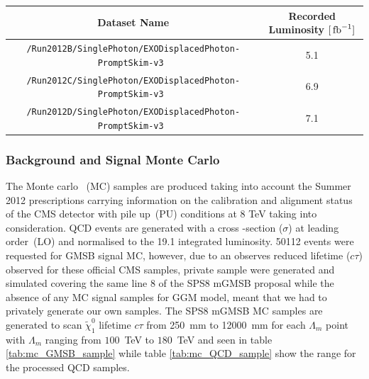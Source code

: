 \begin{center}
\centering
\begin{tabular}{c c}
\hline
Dataset Name & Recorded Luminosity $[\mbox{\ensuremath{\,\text{fb}^\text{$-$1}}}]$ \\
\hline
 \texttt{/Run2012B/SinglePhoton/EXODisplacedPhoton-PromptSkim-v3 } & 5.1 \\
 \texttt{/Run2012C/SinglePhoton/EXODisplacedPhoton-PromptSkim-v3 } & 6.9 \\
 \texttt{/Run2012D/SinglePhoton/EXODisplacedPhoton-PromptSkim-v3 } & 7.1 \\
\hline
\end{tabular}
\label{tab:DATA}
\end{center}


\subsubsection*{Background and Signal Monte Carlo}
The Monte carlo ~(MC) samples are produced taking into account the Summer 2012 prescriptions carrying information on the calibration and alignment status of the CMS detector with pile up~(PU) conditions at 8 TeV taking into consideration.
 QCD events are generated with a cross -section ($\sigma$) at leading order~(LO) and normalised to the 19.1 \fbinv integrated luminosity. 50112 events were requested for GMSB signal MC, however, due to an observes reduced lifetime ($c\tau$) observed for these official CMS samples, private sample were generated and simulated covering the same line 8 of the SPS8 mGMSB proposal  while the absence of any MC signal samples for GGM model, meant that we had to privately generate our own samples. The SPS8 mGMSB MC samples are generated to scan $\tilde{\chi}^{0}_{1}$ lifetime $c\tau$ from 250~mm to 12000~mm for each $\Lambda_{m}$ point with $\Lambda_{m}$ ranging from $100$~TeV to $180$~TeV and seen in table \ref{tab:mc_GMSB_sample} while  table \ref{tab:mc_QCD_sample} show the \pt range  for the processed QCD samples.


